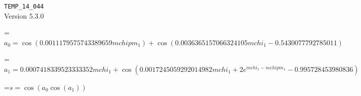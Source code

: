 \documentclass{article}
\newcommand{\exprline}[1]{\par\noindent\begingroup\setbox0=\hbox{$\displaystyle #1$}\ifdim\wd0>\linewidth\resizebox{\linewidth}{!}{\box0}\else\box0\fi\endgroup\par\medskip}
\begin{document}
\noindent\texttt{TEMP\_14\_044}\\
Version 5.3.0\\
\exprline{a_{0} = \cos{\left(0.0011179575743389659 mchipm_{1} \right)} + \cos{\left(0.0036365157066324105 mchi_{1} - 0.5430077792785011 \right)}}
\exprline{a_{1} = 0.0007418339523333352 mchi_{1} + \cos{\left(0.0017245059292014982 mchi_{1} + 2 e^{mchi_{1} - mchipm_{1}} - 0.995728453980836 \right)}}
\exprline{s = \cos{\left(a_{0} \cos{\left(a_{1} \right)} \right)}}
\end{document}
